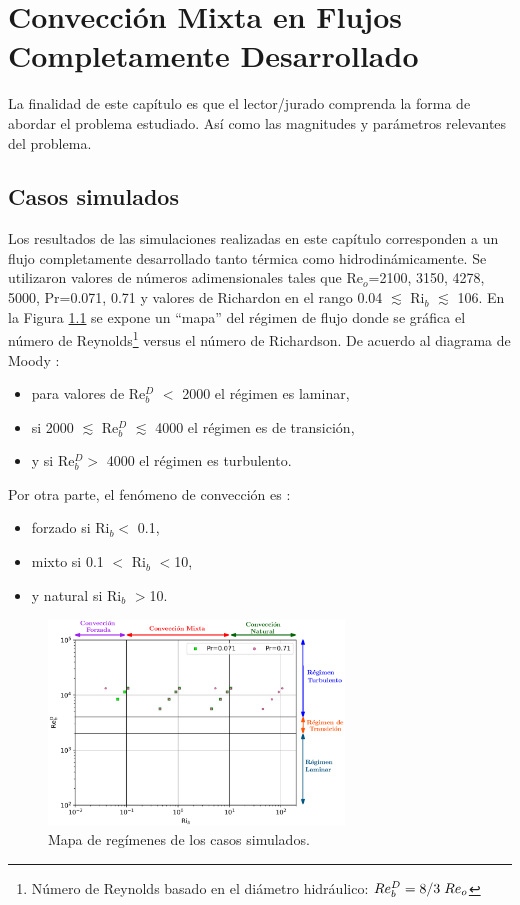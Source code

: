 \chapter{Convección Mixta en Flujos Completamente Desarrollado}


La finalidad de este capítulo es que el lector/jurado comprenda la forma de abordar el problema estudiado. Así como las magnitudes y parámetros relevantes del problema. 


\newpage

\section{Casos simulados} 

Los resultados de las simulaciones realizadas en este capítulo corresponden a un flujo completamente desarrollado tanto térmica como hidrodinámicamente. Se utilizaron valores de números adimensionales tales que Re$_o$=2100, 3150, 4278, 5000, Pr=0.071, 0.71 y valores de Richardon en el rango 0.04 $\lesssim$ Ri$_b$ $\lesssim$ 106. En la Figura \ref{fig:map_flow_regime} se expone un ``mapa'' del régimen de flujo donde se gráfica el número de Reynolds\footnote{Número de Reynolds basado en el diámetro hidráulico: $Re^D_b = 8/3 \hspace*{1mm} Re_o$} versus el número de Richardson. De acuerdo al diagrama de Moody \cite{white}:

\begin{itemize}
	\item para valores de Re$^D_b$ $<$ 2000 el régimen es laminar,
	\item si 2000 $\lesssim$ Re$^D_b$ $\lesssim$ 4000 el régimen es de transición,
	\item y si Re$^D_b>$ 4000 el régimen es turbulento.
\end{itemize}
Por otra parte, el fenómeno de convección es \cite{incropera,cengelheat}:

\begin{itemize}
	\item forzado si Ri$_b<$ 0.1,
	\item mixto si 0.1 $<$ Ri$_b$ $<$10,
	\item y natural si Ri$_b$ $>$10.
\end{itemize}

\begin{figure}[H]
  \centering
    \includegraphics[width=0.7\textwidth]{figures/cap5/map.eps}
  \caption{Mapa de regímenes de los casos simulados.}
  \label{fig:map_flow_regime}
\end{figure}

